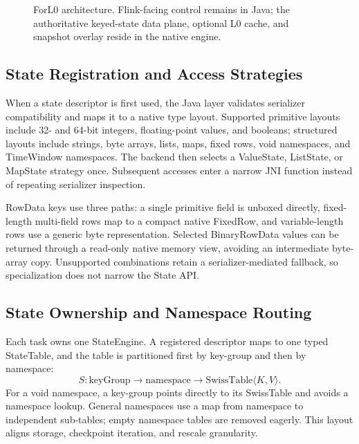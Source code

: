 \documentclass[sigconf]{acmart}
\newcommand{\forlzero}{ForL0\xspace}
\newcommand{\system}{\forlzero}
\begin{document}
\begin{figure}[t]
{%
}
\caption{\system architecture. Flink-facing control remains in Java; the authoritative keyed-state data plane, optional L0 cache, and snapshot overlay reside in the native engine.}
\label{fig:architecture}
\end{figure}

\subsection{State Registration and Access Strategies}

When a state descriptor is first used, the Java layer validates serializer compatibility and maps it to a native type layout. Supported primitive layouts include 32- and 64-bit integers, floating-point values, and booleans; structured layouts include strings, byte arrays, lists, maps, fixed rows, void namespaces, and TimeWindow namespaces. The backend then selects a ValueState, ListState, or MapState strategy once. Subsequent accesses enter a narrow JNI function instead of repeating serializer inspection.

RowData keys use three paths: a single primitive field is unboxed directly, fixed-length multi-field rows map to a compact native FixedRow, and variable-length rows use a generic byte representation. Selected BinaryRowData values can be returned through a read-only native memory view, avoiding an intermediate byte-array copy. Unsupported combinations retain a serializer-mediated fallback, so specialization does not narrow the State API.

\subsection{State Ownership and Namespace Routing}

Each task owns one StateEngine. A registered descriptor maps to one typed StateTable, and the table is partitioned first by key-group and then by namespace:
\begin{equation}
S: \mathrm{keyGroup} \rightarrow \mathrm{namespace} \rightarrow \mathrm{SwissTable}\langle K,V\rangle.
\end{equation}
For a void namespace, a key-group points directly to its SwissTable and avoids a namespace lookup. General namespaces use a map from namespace to independent sub-tables; empty namespace tables are removed eagerly. This layout aligns storage, checkpoint iteration, and rescale granularity.
\end{document}
